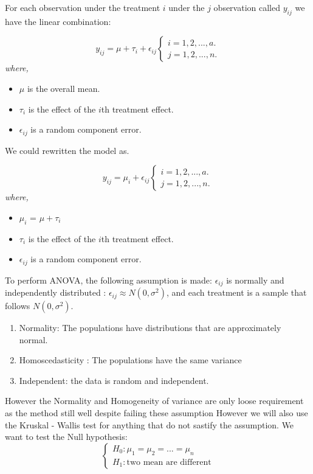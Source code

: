 For each observation under the treatment $i$ under the $j$ observation called $y_{ij}$ we have the linear combination:

\[y_{ij} = \mu + \tau_i + \epsilon_{ij} 
\begin{cases}
    i = 1,2,...,a.\\
    j = 1,2,...,n.
\end{cases}
\]
\textit{where,}
\begin{itemize}
    \item $\mu$ is the overall mean.
    \item $\tau_i$ is the effect of the $i$th treatment effect.
    \item $\epsilon_{ij}$ is a random component error.
\end{itemize}

We could rewritten the model as.

\[y_{ij} = \mu_i + \epsilon_{ij} 
\begin{cases}
    i = 1,2,...,a.\\
    j = 1,2,...,n.
\end{cases}
\]
\textit{where,}
\begin{itemize}
    \item $\mu_i$ =  $\mu + \tau_i$
    \item $\tau_i$ is the effect of the $i$th treatment effect.
    \item $\epsilon_{ij}$ is a random component error.
\end{itemize}

To perform ANOVA, the following assumption is made: $\epsilon_{ij}$ is normally and independently 
distributed : $\epsilon_{ij} \approx N(0, \sigma^2)$, and each treatment is a sample that follows $N(0, \sigma^2)$.


\begin{enumerate}
    \item Normality: The populations have distributions that are approximately normal.
    \item Homoscedasticity  : The populations have the same variance
    \item Independent: the data is random and independent.
\end{enumerate}

However the Normality and Homogeneity of variance are only loose requirement as the method still well despite failing these assumption\cite{mont03}
However we will also use the Kruskal - Wallis test for anything that do not sastify the assumption.
We want to test the Null hypothesis:
\[
\begin{cases}
    H_0: \mu_1 = \mu_2 = ... = \mu_n \\
    H_1: \text{two mean are different}
\end{cases}
\]


